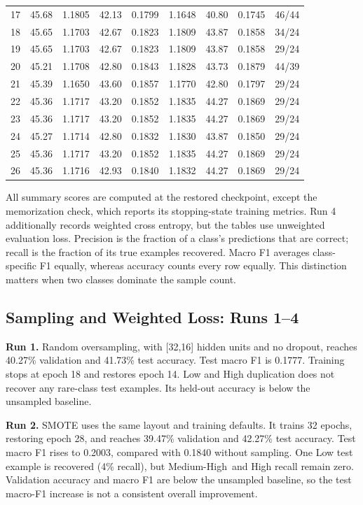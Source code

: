 \documentclass[11pt,letterpaper]{article}
\newcommand{\MH}{Medium-High}
\newcommand{\run}[1]{\textbf{Run #1.}}
\begin{document}
\begin{table}[!t]
\begin{tabular*}{\textwidth}{@{\extracolsep{\fill}}rrrrrrrrl@{}}
17 & 45.68 & 1.1805 & 42.13 & 0.1799 & 1.1648 & 40.80 & 0.1745 & 46/44 \\
18 & 45.65 & 1.1703 & 42.67 & 0.1823 & 1.1809 & 43.87 & 0.1858 & 34/24 \\
19 & 45.65 & 1.1703 & 42.67 & 0.1823 & 1.1809 & 43.87 & 0.1858 & 29/24 \\
20 & 45.21 & 1.1708 & 42.80 & 0.1843 & 1.1828 & 43.73 & 0.1879 & 44/39 \\
21 & 45.39 & 1.1650 & 43.60 & 0.1857 & 1.1770 & 42.80 & 0.1797 & 29/24 \\
22 & 45.36 & 1.1717 & 43.20 & 0.1852 & 1.1835 & 44.27 & 0.1869 & 29/24 \\
23 & 45.36 & 1.1717 & 43.20 & 0.1852 & 1.1835 & 44.27 & 0.1869 & 29/24 \\
24 & 45.27 & 1.1714 & 42.80 & 0.1832 & 1.1830 & 43.87 & 0.1850 & 29/24 \\
25 & 45.36 & 1.1717 & 43.20 & 0.1852 & 1.1835 & 44.27 & 0.1869 & 29/24 \\
26 & 45.36 & 1.1716 & 42.93 & 0.1840 & 1.1832 & 44.27 & 0.1869 & 29/24 \\
\bottomrule
\end{tabular*}
\end{table}

All summary scores are computed at the restored checkpoint, except the memorization check, which reports its stopping-state training metrics. Run 4 additionally records weighted cross entropy, but the tables use unweighted evaluation loss. Precision is the fraction of a class's predictions that are correct; recall is the fraction of its true examples recovered. Macro F1 averages class-specific F1 equally, whereas accuracy counts every row equally. This distinction matters when two classes dominate the sample count.

\subsection{Sampling and Weighted Loss: Runs 1--4}
\run{1} Random oversampling, with [32,16] hidden units and no dropout, reaches 40.27\% validation and 41.73\% test accuracy. Test macro F1 is 0.1777. Training stops at epoch 18 and restores epoch 14. Low and High duplication does not recover any rare-class test examples. Its held-out accuracy is below the unsampled baseline.

\run{2} SMOTE uses the same layout and training defaults. It trains 32 epochs, restoring epoch 28, and reaches 39.47\% validation and 42.27\% test accuracy. Test macro F1 rises to 0.2003, compared with 0.1840 without sampling. One Low test example is recovered (4\% recall), but \MH\ and High recall remain zero. Validation accuracy and macro F1 are below the unsampled baseline, so the test macro-F1 increase is not a consistent overall improvement.
\end{document}
